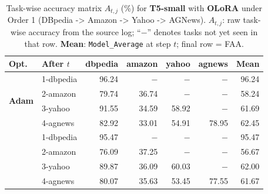 \begin{table}[ht]
\centering
\caption{%
  Task-wise accuracy matrix $A_{t,j}$ (\%) for \textbf{T5-small} with \textbf{OLoRA} under Order 1 (DBpedia -> Amazon -> Yahoo -> AGNews).
  $A_{t,j}$: raw task-wise accuracy from the source log; ``$-$'' denotes tasks not yet seen in that row.
  \textbf{Mean}: \texttt{Model\_Average} at step $t$; final row = FAA.
}
\label{tab:nlp_o1_t5small_olora}
\setlength{\tabcolsep}{4.0pt}
\renewcommand{\arraystretch}{0.92}
\scriptsize
\begin{tabular}{@{}l l r r r r r@{}}
\toprule
\textbf{Opt.} & \textbf{After $t$} & \textbf{dbpedia} & \textbf{amazon} & \textbf{yahoo} & \textbf{agnews} & \textbf{Mean} \\
\midrule
\multirow{4}{*}{\textbf{Adam}} & 1-dbpedia & 96.24 & $-$ & $-$ & $-$ & 96.24 \\
 & 2-amazon & 79.74 & 36.74 & $-$ & $-$ & 58.24 \\
 & 3-yahoo & 91.55 & 34.59 & 58.92 & $-$ & 61.69 \\
 & 4-agnews & 82.92 & 33.01 & 54.91 & 78.95 & 62.45 \\
\addlinespace[2pt]
\multirow{4}{*}{\textbf{SAM}} & 1-dbpedia & 95.47 & $-$ & $-$ & $-$ & 95.47 \\
 & 2-amazon & 76.09 & 37.25 & $-$ & $-$ & 56.67 \\
 & 3-yahoo & 89.87 & 36.09 & 60.03 & $-$ & 62.00 \\
 & 4-agnews & 80.07 & 35.63 & 53.45 & 77.55 & 61.67 \\
\bottomrule
\end{tabular}
\end{table}

